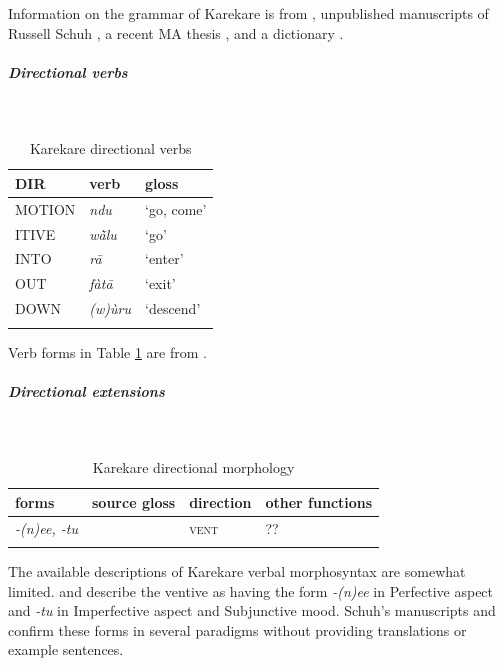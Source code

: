 Information on the grammar of Karekare is from \citet{zochVerbalmorphologieBoleTangaleSprachenWesttschadisch2014}, unpublished manuscripts of Russell Schuh \citep{schuhKarekareVerbalParadigmsn.d.,schuhKarekareVerbalSystemn.d.}, a recent MA thesis \citep{abareVerbalMorphosyntaxKaraiKarai2020}, and a dictionary \citep{gamboKarekareEnglishHausaDictionary2004}. 

\subparagraph{Directional verbs}~



\begin{table}[H]
	\caption{Karekare directional verbs}
	\label{tab:kareV}
	\begin{tabular}{lll} %
		\lsptoprule
		DIR & verb & gloss   \\ %
		\midrule
		MOTION & \textit{ndu} & `go, come' \\
		ITIVE & \textit{wā̀lu} & `go' \\
		INTO& \textit{rā} & `enter' \\
		OUT & \textit{fàtā} & `exit' \\
		DOWN & \textit{(w)ùru} & `descend' \\
		\lspbottomrule
	\end{tabular}
\end{table}

Verb forms in Table \ref{tab:kareV} are from \citet{gamboKarekareEnglishHausaDictionary2004}.

\subparagraph{Directional extensions}~



\begin{table}[H]
	\caption{Karekare directional morphology}
	\label{tab:kare}
	\begin{tabular}{llll} %
		\lsptoprule
		forms & source gloss & direction  & other functions  \\ %
		\midrule
		\textit{-(n)ee, -tu}  &    &   \textsc{vent} &   ??  \\
		\lspbottomrule
	\end{tabular}
\end{table} 

The available descriptions of Karekare verbal morphosyntax are somewhat limited. \citet[viii]{gamboKarekareEnglishHausaDictionary2004} and \citet[287]{zochVerbalmorphologieBoleTangaleSprachenWesttschadisch2014} describe the ventive as having the form \textit{-(n)ee} in Perfective aspect and \textit{-tu} in Imperfective aspect and Subjunctive mood. Schuh's manuscripts and \citet[48]{abareVerbalMorphosyntaxKaraiKarai2020} confirm these forms in several paradigms without providing translations or example sentences.


